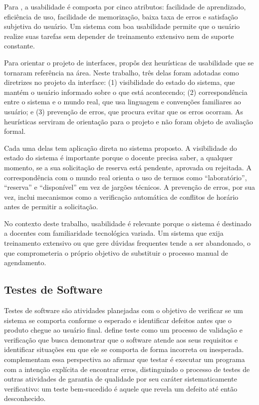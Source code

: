 Para , a usabilidade é composta por cinco atributos: facilidade de aprendizado, eficiência de uso, facilidade de memorização, baixa taxa de erros e satisfação subjetiva do usuário. Um sistema com boa usabilidade permite que o usuário realize suas tarefas sem depender de treinamento extensivo nem de suporte constante.

Para orientar o projeto de interfaces,  propôs dez heurísticas de usabilidade que se tornaram referência na área. Neste trabalho, três delas foram adotadas como diretrizes no projeto da interface: (1) visibilidade do estado do sistema, que mantém o usuário informado sobre o que está acontecendo; (2) correspondência entre o sistema e o mundo real, que usa linguagem e convenções familiares ao usuário; e (3) prevenção de erros, que procura evitar que os erros ocorram. As heurísticas serviram de orientação para o projeto e não foram objeto de avaliação formal.

Cada uma delas tem aplicação direta no sistema proposto. A visibilidade do estado do sistema é importante porque o docente precisa saber, a qualquer momento, se a sua solicitação de reserva está pendente, aprovada ou rejeitada. A correspondência com o mundo real orienta o uso de termos como ``laboratório'', ``reserva'' e ``disponível'' em vez de jargões técnicos. A prevenção de erros, por sua vez, inclui mecanismos como a verificação automática de conflitos de horário antes de permitir a solicitação.

No contexto deste trabalho, usabilidade é relevante porque o sistema é destinado a docentes com familiaridade tecnológica variada. Um sistema que exija treinamento extensivo ou que gere dúvidas frequentes tende a ser abandonado, o que comprometeria o próprio objetivo de substituir o processo manual de agendamento.
\subsection{Testes de Software}
\label{sec:testes}

Testes de software são atividades planejadas com o objetivo de verificar se um sistema se comporta conforme o esperado e identificar defeitos antes que o produto chegue ao usuário final.  define teste como um processo de validação e verificação que busca demonstrar que o software atende aos seus requisitos e identificar situações em que ele se comporta de forma incorreta ou inesperada.  complementam essa perspectiva ao afirmar que testar é executar um programa com a intenção explícita de encontrar erros, distinguindo o processo de testes de outras atividades de garantia de qualidade por seu caráter sistematicamente verificativo: um teste bem-sucedido é aquele que revela um defeito até então desconhecido.

